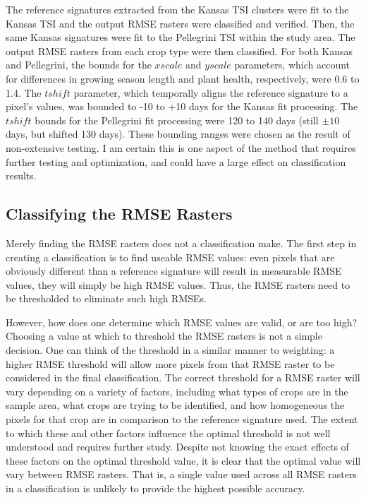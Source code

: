 The reference signatures extracted from the Kansas TSI clusters were fit to the Kansas TSI and the output RMSE rasters were classified and verified. Then, the same Kansas signatures were fit to the Pellegrini TSI within the study area. The output RMSE rasters from each crop type were then classified. For both Kansas and Pellegrini, the bounds for the $xscale$ and $yscale$ parameters, which account for differences in growing season length and plant health, respectively, were 0.6 to 1.4. The $tshift$ parameter, which temporally aligns the reference signature to a pixel's values, was bounded to -10 to +10 days for the Kansas fit processing. The $tshift$ bounds for the Pellegrini fit processing were 120 to 140 days (still $\pm10$ days, but shifted 130 days). These bounding ranges were chosen as the result of non-extensive testing. I am certain this is one aspect of the method that requires further testing and optimization, and could have a large effect on classification results.


\subsection{Classifying the RMSE Rasters}
\label{methods:classification}

Merely finding the RMSE rasters does not a classification make. The first step in creating a classification is to find useable RMSE values: even pixels that are obviously different than a reference signature will result in measurable RMSE values, they will simply be high RMSE values. Thus, the RMSE rasters need to be thresholded to eliminate such high RMSEs.

However, how does one determine which RMSE values are valid, or are too high? Choosing a value at which to threshold the RMSE rasters is not a simple decision. One can think of the threshold in a similar manner to weighting: a higher RMSE threshold will allow more pixels from that RMSE raster to be considered in the final classification. The correct threshold for a RMSE raster will vary depending on a variety of factors, including what types of crops are in the sample area, what crops are trying to be identified, and how homogeneous the pixels for that crop are in comparison to the reference signature used. The extent to which these and other factors influence the optimal threshold is not well understood and requires further study. Despite not knowing the exact effects of these factors on the optimal threshold value, it is clear that the optimal value will vary between RMSE rasters. That is, a single value used across all RMSE rasters in a classification is unlikely to provide the highest possible accuracy.

